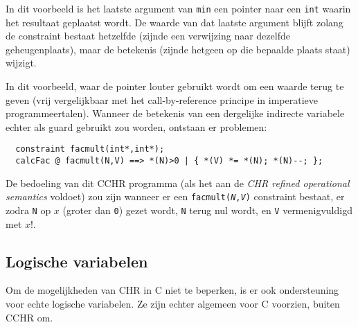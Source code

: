 In dit voorbeeld is het laatste argument van {\tt min} een pointer naar een {\tt int} waarin het resultaat geplaatst wordt. De
waarde van dat laatste argument blijft zolang de constraint bestaat hetzelfde (zijnde een verwijzing naar dezelfde
geheugenplaats), maar de betekenis (zijnde hetgeen op die bepaalde plaats staat) wijzigt.

In dit voorbeeld, waar de pointer louter gebruikt wordt om een waarde terug te geven (vrij vergelijkbaar met het
call-by-reference principe in imperatieve programmeertalen). Wanneer de betekenis van een dergelijke indirecte variabele echter als guard gebruikt zou worden, ontstaan
er problemen: \begin{Verbatim}
  constraint facmult(int*,int*);
  calcFac @ facmult(N,V) ==> *(N)>0 | { *(V) *= *(N); *(N)--; };
\end{Verbatim}

De bedoeling van dit CCHR programma (als het aan de {\em CHR refined operational semantics} voldoet) zou zijn wanneer er een
{\tt facmult({\em N},{\em V})} constraint bestaat, er zodra {\tt *N} op $x$ (groter dan {\tt 0}) gezet wordt, {\tt *N} terug
nul wordt, en {\tt *V} vermenigvuldigd met $x!$.

\subsection{Logische variabelen}

Om de mogelijkheden van CHR in C niet te beperken, is er ook ondersteuning voor echte logische variabelen. Ze zijn echter
algemeen voor C voorzien, buiten CCHR om. 
